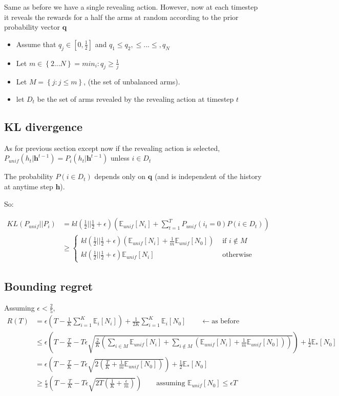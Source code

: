 \documentclass{article}
\newcommand{\E}{\mathbb E}
\newcommand{\set}[1]{\left\{#1\right\}}
\newcommand{\eqn}[1]{\begin{align}#1\end{align}}
\renewcommand{\Pi}[1]{P_i\left( #1 \right)}
\newcommand{\Pu}[1]{P_{unif}\left( #1 \right)}
\newcommand{\Ei}[1]{\E_i\left[ #1 \right]}
\newcommand{\Eu}[1]{\E_{unif}\left[ #1 \right]}
\newcommand{\Es}[1]{\E_{*}\left[ #1 \right]}
\newcommand{\kl}[2]{KL\left(#1 || #2 \right)}
\theoremstyle{plain}
\theoremstyle{definition}
\begin{document}
Same as before we have a single revealing action. However, now at each timestep it reveals the rewards for a half the arms at random according to the prior probability vector $\boldsymbol{q}$


\begin{itemize}
\item Assume that $q_j \in [0,\frac{1}{2}]$ and $q_1 \leq q_2, \leq ...\leq,q_N$ 
\item Let $m \in \set{2...N} = min_i : q_j \geq \frac{1}{j}$
\item Let $M = \set{j:j \leq m}$, (the set of unbalanced arms).
\item let $D_t$ be the set of arms revealed by the revealing action at timestep $t$
\end{itemize}


\subsection{KL divergence}
As for previous section except now if the revealing action is selected, $\Pu{h_t|\boldsymbol h^{t-1}} = \Pi{h_t|\boldsymbol h^{t-1}}$ unless $i \in D_t$

The probability $P(i \in D_t)$ depends only on $\boldsymbol{q}$ (and is independent of the history at anytime step $\boldsymbol{h}$). 

So:

\eqn {
\kl{P_{unif}}{P_i} & = kl(\frac{1}{2}||\frac{1}{2}+\epsilon)\left(\Eu{N_i}+\sum_{t=1}^T\Pu{i_t=0}P(i \in D_t)\right)\\
&\geq \begin{cases}
kl(\frac{1}{2}||\frac{1}{2}+\epsilon)\left(\Eu{N_i}+\frac{1}{m}\Eu{N_0}\right) & \text{ if } i \notin M \\
kl(\frac{1}{2}||\frac{1}{2}+\epsilon)\Eu{N_i} & \text{ otherwise }
\end{cases}
}

\subsection{Bounding regret}
Assuming $ \epsilon < \frac{2}{5}$,
\eqn {
R(T) &= \epsilon  \left(T -\frac{1}{K}\sum_{i=1}^K\Ei{N_i}\right) + \frac{1}{2K}\sum_{i=1}^K\Ei{N_0} \qquad \leftarrow \text{as before}\\
&\leq \epsilon \left(T - \frac{T}{K} - T\epsilon\sqrt{\frac{2}{K}\left(\sum_{i\in M}\Eu{N_i} + \sum_{i \notin M}(\Eu{N_i}+\frac{1}{m}\Eu{N_0})  \right)}   \right)+\frac{1}{2}\Es{N_0}\\
&= \epsilon \left(T - \frac{T}{K} - T\epsilon\sqrt{2\left(\frac{T}{K} + \frac{1}{m}\Eu{N_0}\right)}   \right)+\frac{1}{2}\Es{N_0}\\
&\geq \frac{\epsilon}{3} \left(T - \frac{T}{K} - T\epsilon\sqrt{2T\left(\frac{1}{K} + \frac{\epsilon}{m}\right)}   \right) \qquad \text{assuming } \Eu{N_0} \leq \epsilon T
}
\end{document}
